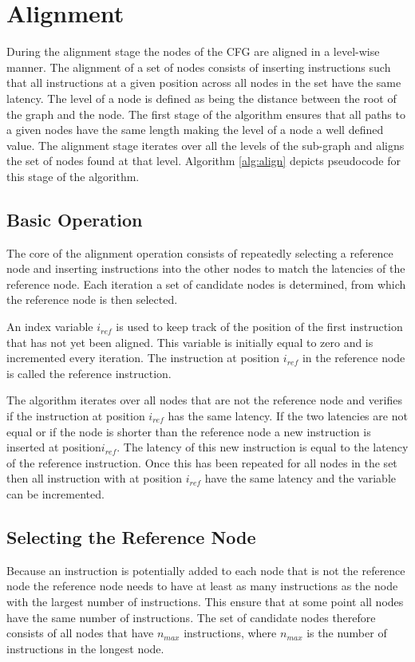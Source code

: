 \section{Alignment} \label{seq:alignment}

During the alignment stage the nodes of the CFG are aligned in a level-wise manner. 
The alignment of a set of nodes consists of inserting instructions such that all instructions at a given position across all nodes in the set have the same latency. 
The level of a node is defined as being the distance between the root of the graph and the node. The first stage of the algorithm ensures that all paths to a given nodes have the same length making the level of a node a well 
defined value. The alignment stage iterates over all the levels of the sub-graph and aligns the set of nodes found at that level. Algorithm \ref{alg:align} depicts pseudocode for this stage of the algorithm.

\subsection{Basic Operation}
The core of the alignment operation consists of repeatedly selecting a reference node and inserting instructions into the other nodes to match the latencies of the reference node. 
Each iteration a set of candidate nodes is determined, from which the reference node is then selected. 

An index variable $i_{ref}$ is used to keep track of the position of the first instruction that has not yet been aligned. This variable is initially equal to zero and is incremented every iteration. 
The instruction at position $i_{ref}$ in the reference node is called the reference instruction.

The algorithm iterates over all nodes that are not the reference node and verifies if the instruction at position $i_{ref}$ has the same latency. 
If the two latencies are not equal or if the node is shorter than the reference node a new instruction is inserted at position$i_{ref}$. 
The latency of this new instruction is equal to the latency of the reference instruction. 
Once this has been repeated for all nodes in the set then all instruction with at position $i_{ref}$ have the same latency and the variable can be incremented. 

\subsection{Selecting the Reference Node}
Because an instruction is potentially added to each node that is not the reference node the reference node needs to have at least as many instructions as the node with the largest number of instructions. 
This ensure that at some point all nodes have the same number of instructions. 
The set of candidate nodes therefore consists of all nodes that have $n_{max}$ instructions, where $n_{max}$ is the number of instructions in the longest node. 

